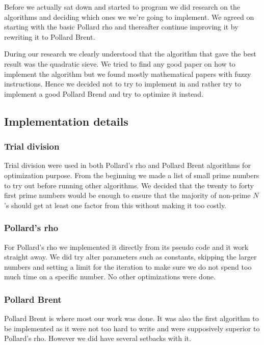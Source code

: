 Before we actually sat down and started to program we did research on the algorithms and deciding which ones we we’re going to implement. We agreed on starting with the basic Pollard rho and thereafter continue improving it by rewriting it to Pollard Brent.

During our research we clearly understood that the algorithm that gave the best result was the quadratic sieve. We tried to find any good paper on how to implement the algorithm but we found mostly mathematical papers with fuzzy instructions. Hence we decided not to try to implement in and rather try to implement a good Pollard Brend and try to optimize it instead.

\subsection{Implementation details}

\subsubsection{Trial division}

Trial division were used in both Pollard’s rho and Pollard Brent algorithms for optimization purpose. From the beginning we made a list of small prime numbers to try out before running other algorithms. We decided that the twenty to forty first prime numbers would be enough to ensure that the majority of non-prime $N$’s should get at least one factor from this without making it too costly.

\subsubsection{Pollard’s rho}

For Pollard’s rho we implemented it directly from its pseudo code and it work straight away. We did try alter parameters such as constants, skipping the larger numbers and setting a limit for the iteration to make sure we do not spend too much time on a specific number. No other optimizations were done. 

\subsubsection{Pollard Brent}

Pollard Brent is where most our work was done. It was also the first algorithm to be implemented as it were not too hard to write and were supposively superior to Pollard’s rho. However we did have several setbacks with it.

